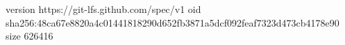version https://git-lfs.github.com/spec/v1
oid sha256:48ca67e8820a4c01441818290d652fb3871a5dcf092feaf7323d473cb4178e90
size 626416
